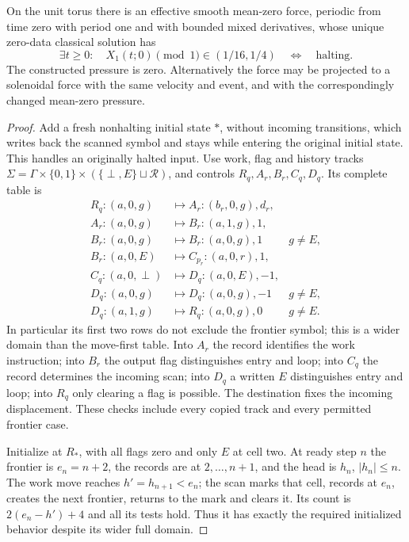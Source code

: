 \begin{theorem}\label{thm:bb-shuttle-periodic}
On the unit torus there is an effective smooth mean-zero force,
periodic from time zero with period one and with bounded mixed
derivatives, whose unique zero-data classical solution has
\[
 \exists t\ge0:\quad X_1(t;0)\pmod1\in(1/16,1/4)
 \quad\Longleftrightarrow\quad\text{halting}.
\]
The constructed pressure is zero.  Alternatively the force may be
projected to a solenoidal force with the same velocity and event,
and with the correspondingly changed mean-zero pressure.
\end{theorem}
\begin{proof}\label{proof:bb-shuttle-periodic}
Add a fresh nonhalting initial state $*$, without incoming transitions,
which writes back the scanned symbol and stays while entering the
original initial state.  This handles an originally halted input.
Use work, flag and history tracks
$\Sigma=\Gamma\times\{0,1\}\times(\{\perp,E\}\sqcup\mathcal R)$,
and controls $R_q,A_r,B_r,C_q,D_q$.  Its complete table is
\begin{equation}\label{eq:bb-shuttle-table}
\begin{array}{lll}
 R_q:(a,0,g)&\mapsto A_r:(b_r,0,g),d_r,\\
 A_r:(a,0,g)&\mapsto B_r:(a,1,g),1,\\
 B_r:(a,0,g)&\mapsto B_r:(a,0,g),1&g\ne E,\\
 B_r:(a,0,E)&\mapsto C_{p_r}:(a,0,r),1,\\
 C_q:(a,0,\perp)&\mapsto D_q:(a,0,E),-1,\\
 D_q:(a,0,g)&\mapsto D_q:(a,0,g),-1&g\ne E,\\
 D_q:(a,1,g)&\mapsto R_q:(a,0,g),0&g\ne E.
\end{array}
\end{equation}
In particular its first two rows do not exclude the frontier symbol;
this is a wider domain than the move-first table.  Into $A_r$ the
record identifies the work instruction; into $B_r$ the output flag
distinguishes entry and loop; into $C_q$ the record determines the
incoming scan; into $D_q$ a written $E$ distinguishes entry and loop;
into $R_q$ only clearing a flag is possible.  The destination fixes
the incoming displacement.  These checks include every copied track
and every permitted frontier case.

Initialize at $R_*$, with all flags zero and only $E$ at cell two.
At ready step $n$ the frontier is $e_n=n+2$, the records are at
$2,\ldots,n+1$, and the head is $h_n$, $|h_n|\le n$.
The work move reaches $h'=h_{n+1}<e_n$; the scan marks that cell,
records at $e_n$, creates the next frontier, returns to the mark and
clears it.  Its count is $2(e_n-h')+4$ and all its tests hold.
Thus it has exactly the required initialized behavior despite its
wider full domain.


\end{proof}
